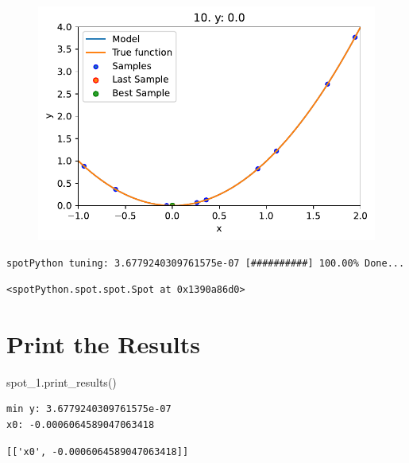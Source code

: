 \documentclass[
  letterpaper,
  DIV=11,
  numbers=noendperiod]{scrreprt}
\newenvironment{Shaded}{\begin{snugshade}}{\end{snugshade}}
\newcommand{\NormalTok}[1]{\textcolor[rgb]{0.00,0.23,0.31}{#1}}
\begin{document}
\begin{figure}[H]

{\centering \includegraphics{01_spot_intro_files/figure-pdf/cell-10-output-2.pdf}

}

\end{figure}

\begin{verbatim}
spotPython tuning: 3.6779240309761575e-07 [##########] 100.00% Done...
\end{verbatim}

\begin{verbatim}
<spotPython.spot.spot.Spot at 0x1390a86d0>
\end{verbatim}

\hypertarget{print-the-results}{%
\section{Print the Results}\label{print-the-results}}

\begin{Shaded}
\begin{Highlighting}[]
\NormalTok{spot\_1.print\_results()}
\end{Highlighting}
\end{Shaded}

\begin{verbatim}
min y: 3.6779240309761575e-07
x0: -0.0006064589047063418
\end{verbatim}

\begin{verbatim}
[['x0', -0.0006064589047063418]]
\end{verbatim}
\end{document}
